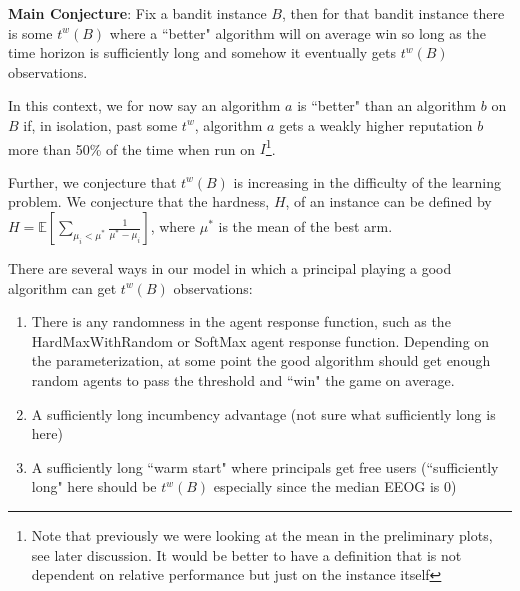 \documentclass[11pt,letterpaper]{article}
\begin{document}
\textbf{Main Conjecture}: Fix a bandit instance $B$, then for that bandit instance there is some $t^{w}(B)$ where a ``better" algorithm will on average win so long as the time horizon is sufficiently long and somehow it eventually gets $t^{w}(B)$ observations.

In this context, we for now say an algorithm $a$ is ``better" than an algorithm $b$ on $B$ if, in isolation, past some $t^{w}$, algorithm $a$ gets a weakly higher reputation $b$ more than 50\% of the time when run on $I$\footnote{Note that previously we were looking at the mean in the preliminary plots, see later discussion. It would be better to have a definition that is not dependent on relative performance but just on the instance itself }.

Further, we conjecture that $t^{w}(B)$ is increasing in the difficulty of the learning problem. We conjecture that the hardness, $H$, of an instance can be defined by \\ $H = \mathbb{E}[\sum\limits_{\mu_{i} < \mu^{*}} \frac{1}{\mu^{*} - \mu_{i}}]$, where $\mu^{*}$ is the mean of the best arm.

There are several ways in our model in which a principal playing a good algorithm can get $t^{w}(B)$ observations:
\begin{enumerate}
\item There is any randomness in the agent response function, such as the HardMaxWithRandom or SoftMax agent response function. Depending on the parameterization, at some point the good algorithm should get enough random agents to pass the threshold and ``win" the game on average.
\item A sufficiently long incumbency advantage (not sure what sufficiently long is here)
\item A sufficiently long ``warm start" where principals get free users (``sufficiently long" here should be $t^{w}(B)$ especially since the median EEOG is $0$)
\end{enumerate}
\end{document}
